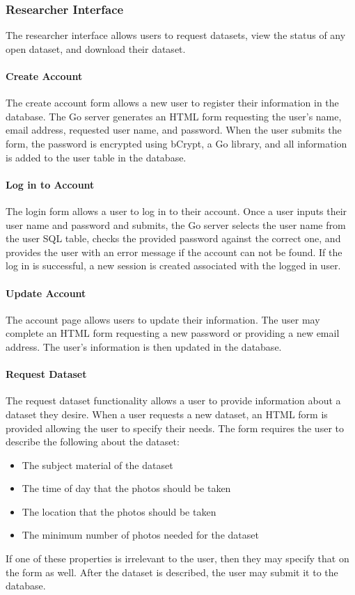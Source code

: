 \documentclass{article}
\begin{document}
\subsubsection{Researcher Interface}
The researcher interface allows users to request datasets, view the status of
any open dataset, and download their dataset.

\paragraph{Create Account}
The create account form allows a new user to register their information in the
database. The Go server generates an HTML form requesting the user's name,
email address, requested user name, and password. When the user submits the
form, the password is encrypted using bCrypt, a Go library, and all information
is added to the user table in the database.

\paragraph{Log in to Account}
The login form allows a user to log in to their account. Once a user inputs
their user name and password and submits, the Go server selects the user name
from the user SQL table, checks the provided password against the correct one,
and provides the user with an error message if the account can not be found. If
the log in is successful, a new session is created associated with the logged
in user.

\paragraph{Update Account}
The account page allows users to update their information. The user may
complete an HTML form requesting a new password or providing a new email
address. The user's information is then updated in the database.

\paragraph{Request Dataset}
The request dataset functionality allows a user to provide information about a
dataset they desire. When a user requests a new dataset, an HTML form is
provided allowing the user to specify their needs. The form requires the user
to describe the following about the dataset:
\begin{itemize}
  \item The subject material of the dataset
  \item The time of day that the photos should be taken
  \item The location that the photos should be taken
  \item The minimum number of photos needed for the dataset
\end{itemize}
If one of these properties is irrelevant to the user, then they may specify
that on the form as well. After the dataset is described, the user may submit
it to the database.
\end{document}
